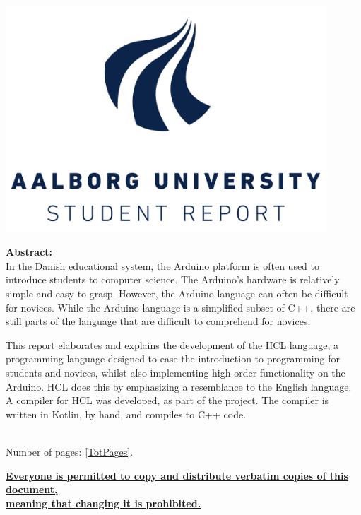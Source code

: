 \begin{minipage}[T]{0.45\textwidth}
 \begin{flushright}
  \includegraphics[width=0.9\textwidth]{images/aau_logo.pdf}\\[1.0 cm]
 \end{flushright}
 \begin{flushleft}
  \textbf{Abstract:}\\
  In the Danish educational system, the Arduino platform is often used to introduce students to computer science. 
  The Arduino's hardware is relatively simple and easy to grasp. 
  However, the Arduino language can often be difficult for novices.
  While the Arduino language is a simplified subset of C++, there are still parts of the language that are difficult to comprehend for novices.
  
  This report elaborates and explains the development of the HCL language, a programming language designed to ease the introduction to programming for students and novices, whilst also implementing high-order functionality on the Arduino.
  HCL does this by emphasizing a resemblance to the English language.
  A compiler for HCL was developed, as part of the project.
  The compiler is written in Kotlin, by hand, and compiles to C++ code.
  
  
 \end{flushleft}
\end{minipage}\\
Number of pages: \ref{TotPages}.\\
\begin{center}
 \begin{scriptsize}
  \textbf{\underline{Everyone is permitted to copy and distribute verbatim copies of this document,}}\\ \textbf{\underline{ meaning that changing it is prohibited.}}
 \end{scriptsize}
\end{center}

